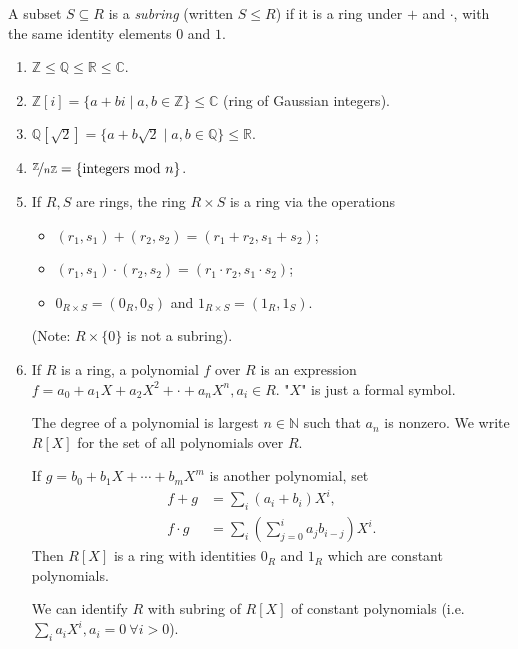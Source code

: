 \begin{definition}
    A subset \(S \subseteq R\) is a \textit{subring} (written \(S \leq R\)) if it is a ring under \(+\) and \(\cdot\), with the same identity elements \(0\) and \(1\).
\end{definition}
\begin{example}
    \leavevmode
    \begin{enumerate}
        \item \(\mathbb{Z} \leq \mathbb{Q}\leq \mathbb{R}\leq \mathbb{C}\).
        \item \(\mathbb{Z}[i] = \{a + bi\mid a,b \in \mathbb{Z}\}\leq \mathbb{C}\) (ring of Gaussian integers).
        \item \(\mathbb{Q}[\sqrt{2}] = \{a + b \sqrt{2} \mid a, b \in \mathbb{Q}\} \leq \mathbb{R}\).
        \item \(\nicefrac{\mathbb{Z}}{n\mathbb{Z}}=\{\text{integers mod }n\}\).
        \item If \(R, S\) are rings, the ring \(R \times S\) is a ring via the operations
        \begin{itemize}
            \item \((r_1,s_1) + (r_2, s_2) = (r_1 + r_2, s_1 + s_2)\);
            \item \((r_1,s_1)\cdot (r_2,s_2) = (r_1 \cdot r_2, s_1 \cdot s_2)\);
            \item \(0_{R\times S} = (0_R, 0_S)\) and \(1_{R\times S} = (1_R, 1_{S})\).
        \end{itemize}
        (Note: \(R \times \{0\}\) is not a subring).
        \item If \(R\) is a ring, a polynomial \(f\) over \(R\) is an expression \(f = a_0 + a_{1}X + a_2 X^2 + \cdot + a_n X^n, a_i \in R\). "\(X\)" is just a formal symbol.

        The degree of a polynomial is largest \(n \in \mathbb{N}\) such that \(a_n\) is nonzero. We write \(R[X]\) for the set of all polynomials over \(R\).

        If \(g = b_0 + b_1 X + \cdots + b_m X^m\) is another polynomial, set
        \begin{align*}
            f + g &= \sum\limits_{i}(a_i + b_i)X^i,\\
            f \cdot g &= \sum_i(\sum\limits_{j=0}^{i} a_{j}b_{i - j})X^i.
        \end{align*}
        Then \(R[X]\) is a ring with identities \(0_R\) and \(1_R\) which are constant polynomials.

        We can identify \(R\) with subring of \(R[X]\) of constant polynomials (i.e. \(\sum\limits_{i}^{} a_i X^i, a_i = 0~\forall i > 0\)).
    \end{enumerate}
\end{example}
